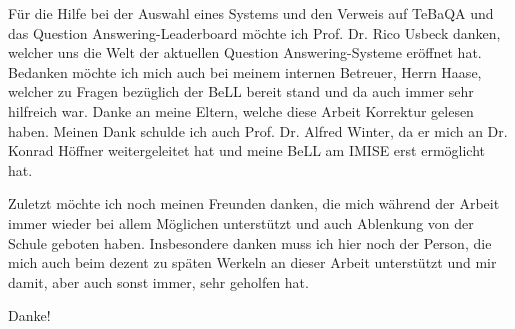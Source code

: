 Für die Hilfe bei der Auswahl eines Systems und den Verweis auf TeBaQA und das Question Answering-Leaderboard möchte ich Prof. Dr. Rico Usbeck danken, welcher uns die Welt der aktuellen Question Answering-Systeme eröffnet hat.
Bedanken möchte ich mich auch bei meinem internen Betreuer, Herrn Haase, welcher zu Fragen bezüglich der BeLL bereit stand und da auch immer sehr hilfreich war.
Danke an meine Eltern, welche diese Arbeit Korrektur gelesen haben.
Meinen Dank schulde ich auch Prof. Dr. Alfred Winter, da er mich an Dr. Konrad Höffner weitergeleitet hat und meine BeLL am IMISE erst ermöglicht hat.

Zuletzt möchte ich noch meinen Freunden danken, die mich während der Arbeit immer wieder bei allem Möglichen unterstützt und auch Ablenkung von der Schule geboten haben.
Insbesondere danken muss ich hier noch der Person, die mich auch beim dezent zu späten Werkeln an dieser Arbeit unterstützt und mir damit, aber auch sonst immer, sehr geholfen hat.

Danke!

\endgroup
